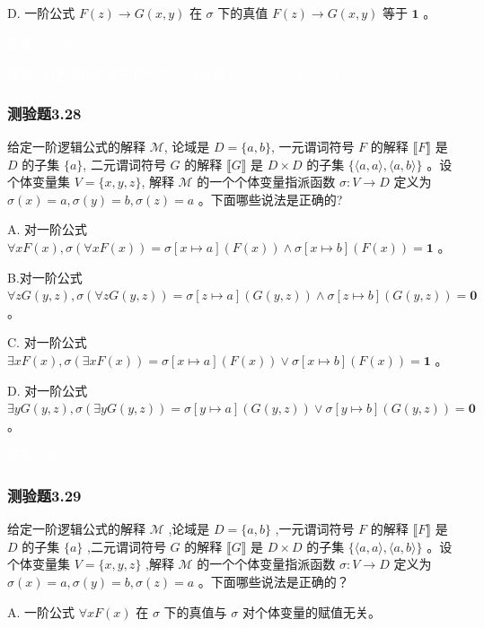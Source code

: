 \documentclass[UTF8, heading=true]{ctexart}
\begin{document}
D.  一阶公式 $F(z) \rightarrow G(x, y)$ 在 $\sigma$ 下的真值 $F(z) \rightarrow G(x, y)$ 等于 $\mathbf{1}$ 。


\textcolor{white}{答案：ABD}

\textcolor{white}{解析：D选项疑似少写了一个$\sigma$，应该是$\sigma(F(z) \rightarrow G(x, y))$。}

\subsubsection{测验题3.28}

给定一阶逻辑公式的解释 $\mathcal{M}$, 
论域是 $D=\{a, b\}$, 一元谓词符号 $F$ 的解释 $\llbracket F \rrbracket$ 
是 $D$ 的子集 $\{a\}$, 二元谓词符号 $G$ 的解释 $\llbracket G \rrbracket$ 是 $D \times D$ 的子集 $\{\langle a, a\rangle,\langle a, b\rangle\}$ 。设个体变量集 $V=\{x, y, z\}$, 解释 $\mathcal{M}$ 的一个个体变量指派函数 $\sigma: V \rightarrow D$ 定义为 $\sigma(x)=a, \sigma(y)=b, \sigma(z)=a$ 。下面哪些说法是正确的?

A. 对一阶公式 $\forall x F(x), \sigma(\forall x F(x))=\sigma[x \mapsto a](F(x)) \wedge \sigma[x \mapsto b](F(x))=\mathbf{1}$ 。

B.对一阶公式 $\forall z G(y, z), \sigma(\forall z G(y, z))=\sigma[z \mapsto a](G(y, z)) \wedge \sigma[z \mapsto b](G(y, z))=\mathbf{0}$ 。

C. 对一阶公式 $\exists x F(x), \sigma(\exists x F(x))=\sigma[x \mapsto a](F(x)) \vee \sigma[x \mapsto b](F(x))=\mathbf{1}$ 。

D. 对一阶公式 $\exists y G(y, z), \sigma(\exists y G(y, z))=\sigma[y \mapsto a](G(y, z)) \vee \sigma[y \mapsto b](G(y, z))=\mathbf{0}$ 。

\textcolor{white}{答案：BC}

\subsubsection{测验题3.29}

给定一阶逻辑公式的解释 $\mathcal{M}$ ,论域是 $D=\{a, b\}$ ,一元谓词符号 $F$ 的解释 $\llbracket F \rrbracket$ 是 $D$ 的子集 $\{a\}$ ,二元谓词符号 $G$ 的解释 $\llbracket G \rrbracket$ 是 $D \times D$ 的子集 $\{\langle a, a\rangle,\langle a, b\rangle\}$ 。设个体变量集 $V=\{x, y, z\}$ ,解释 $\mathcal{M}$ 的一个个体变量指派函数 $\sigma: V \rightarrow D$ 定义为 $\sigma(x)=a, \sigma(y)=b, \sigma(z)=a$ 。下面哪些说法是正确的？

A.
一阶公式 $\forall x F(x)$ 在 $\sigma$ 下的真值与 $\sigma$ 对个体变量的赋值无关。
\end{document}
